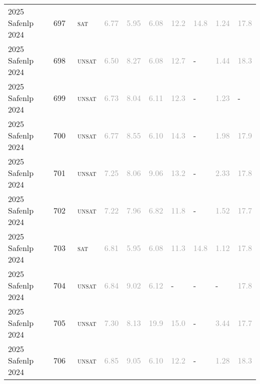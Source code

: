 \begin{center}
{\begin{longtable}{@{}llllllllll@{}}
2025 Safenlp 2024 & 697 & ~\textsc{sat} & \textcolor{darkgray}{6.77} & \textcolor{darkgray}{5.95} & \textcolor{darkgray}{6.08} & \textcolor{darkgray}{12.2} & \textcolor{darkgray}{14.8} & \textcolor{darkgray}{1.24} & \textcolor{darkgray}{17.8} \\
2025 Safenlp 2024 & 698 & ~\textsc{unsat} & \textcolor{darkgray}{6.50} & \textcolor{darkgray}{8.27} & \textcolor{darkgray}{6.08} & \textcolor{darkgray}{12.7} & - & \textcolor{darkgray}{1.44} & \textcolor{darkgray}{18.3} \\
2025 Safenlp 2024 & 699 & ~\textsc{unsat} & \textcolor{darkgray}{6.73} & \textcolor{darkgray}{8.04} & \textcolor{darkgray}{6.11} & \textcolor{darkgray}{12.3} & - & \textcolor{darkgray}{1.23} & - \\
2025 Safenlp 2024 & 700 & ~\textsc{unsat} & \textcolor{darkgray}{6.77} & \textcolor{darkgray}{8.55} & \textcolor{darkgray}{6.10} & \textcolor{darkgray}{14.3} & - & \textcolor{darkgray}{1.98} & \textcolor{darkgray}{17.9} \\
2025 Safenlp 2024 & 701 & ~\textsc{unsat} & \textcolor{darkgray}{7.25} & \textcolor{darkgray}{8.06} & \textcolor{darkgray}{9.06} & \textcolor{darkgray}{13.2} & - & \textcolor{darkgray}{2.33} & \textcolor{darkgray}{17.8} \\
2025 Safenlp 2024 & 702 & ~\textsc{unsat} & \textcolor{darkgray}{7.22} & \textcolor{darkgray}{7.96} & \textcolor{darkgray}{6.82} & \textcolor{darkgray}{11.8} & - & \textcolor{darkgray}{1.52} & \textcolor{darkgray}{17.7} \\
2025 Safenlp 2024 & 703 & ~\textsc{sat} & \textcolor{darkgray}{6.81} & \textcolor{darkgray}{5.95} & \textcolor{darkgray}{6.08} & \textcolor{darkgray}{11.3} & \textcolor{darkgray}{14.8} & \textcolor{darkgray}{1.12} & \textcolor{darkgray}{17.8} \\
2025 Safenlp 2024 & 704 & ~\textsc{unsat} & \textcolor{darkgray}{6.84} & \textcolor{darkgray}{9.02} & \textcolor{darkgray}{6.12} & - & - & - & \textcolor{darkgray}{17.8} \\
2025 Safenlp 2024 & 705 & ~\textsc{unsat} & \textcolor{darkgray}{7.30} & \textcolor{darkgray}{8.13} & \textcolor{darkgray}{19.9} & \textcolor{darkgray}{15.0} & - & \textcolor{darkgray}{3.44} & \textcolor{darkgray}{17.7} \\
2025 Safenlp 2024 & 706 & ~\textsc{unsat} & \textcolor{darkgray}{6.85} & \textcolor{darkgray}{9.05} & \textcolor{darkgray}{6.10} & \textcolor{darkgray}{12.2} & - & \textcolor{darkgray}{1.28} & \textcolor{darkgray}{18.3} \\

\end{longtable}}
\end{center}

